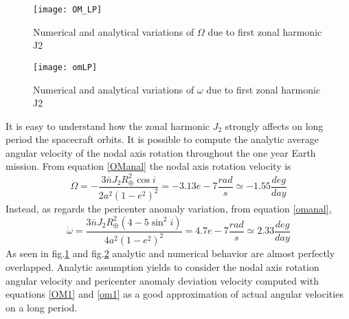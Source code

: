 \begin{figure}[htp]
\centering
\texttt{[image: OM\_LP]}
\caption{Numerical and analytical variations of $\Omega$ due to first zonal harmonic J2}
\label{OM_LP}
\end{figure}

\begin{figure}[hth]
\centering
\texttt{[image: omLP]}
\caption{Numerical and analytical variations of $\omega$ due to first zonal harmonic J2}
\label{omLP1}
\end{figure}

It is easy to understand how the zonal harmonic $J_2$ strongly affects on long period the spacecraft orbits. It is possible to compute the analytic average angular velocity of the nodal axis rotation throughout the one year Earth mission. From equation \ref{OManal} the nodal axis rotation velocity is
\begin{equation}
\dot{\Omega}=-\frac{3\bar{n}J_2R_{\oplus}^2\cos{i}}{2a^2(1-e^2)^2} = -3.13e-7\frac{rad}{s} \simeq -1.55\frac{deg}{day}
\label{OM1}
\end{equation}
Instead, as regards the pericenter anomaly variation, from equation \ref{omanal},
\begin{equation}
\dot{\omega}=\frac{3\bar{n}J_2R_{\oplus}^2(4-5\sin^2{i})}{4a^2(1-e^2)^2}=4.7e-7\frac{rad}{s}\simeq2.33\frac{deg}{day}
\label{om1}
\end{equation}
As seen in fig.\ref{OM_LP} and fig.\ref{omLP1} analytic and numerical behavior are almost perfectly overlapped. Analytic assumption yields to consider the nodal axis rotation angular velocity and pericenter anomaly deviation velocity computed with equations \ref{OM1} and \ref{om1} as a good approximation of actual angular velocities on a long period.